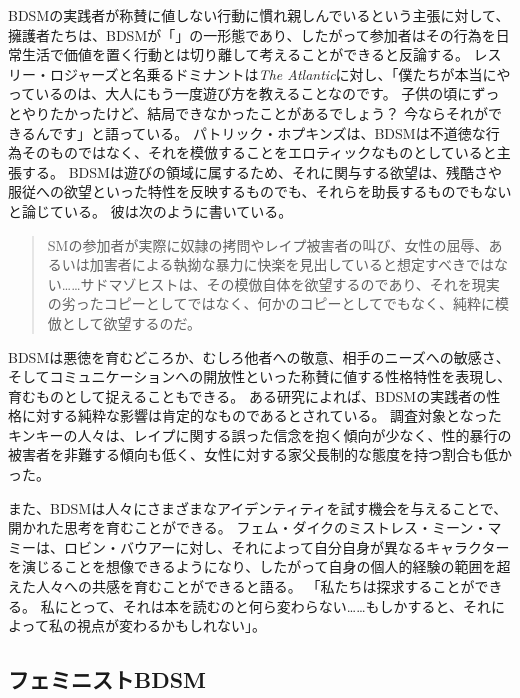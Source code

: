 \documentclass[paper=a4,book,openany]{jlreq}
\begin{document}
BDSMの実践者が称賛に値しない行動に慣れ親しんでいるという主張に対して、擁護者たちは、BDSMが「」の一形態であり、したがって参加者はその行為を日常生活で価値を置く行動とは切り離して考えることができると反論する。
レスリー・ロジャーズと名乗るドミナントは\emph{The Atlantic}に対し、「僕たちが本当にやっているのは、大人にもう一度遊び方を教えることなのです。
子供の頃にずっとやりたかったけど、結局できなかったことがあるでしょう？ 今ならそれができるんです」と語っている\citep{morin15:_that_time_i_tried_bdsm_therap}。
パトリック・ホプキンズは、BDSMは不道徳な行為そのものではなく、それを模倣することをエロティックなものとしていると主張する。
BDSMは遊びの領域に属するため、それに関与する欲望は、残酷さや服従への欲望といった特性を反映するものでも、それらを助長するものでもないと論じている。
彼は次のように書いている。

\begin{quote}
  SMの参加者が実際に奴隷の拷問やレイプ被害者の叫び、女性の屈辱、あるいは加害者による執拗な暴力に快楽を見出していると想定すべきではない……サドマゾヒストは、その模倣自体を欲望するのであり、それを現実の劣ったコピーとしてではなく、何かのコピーとしてでもなく、純粋に模倣として欲望するのだ。
\citep[p.125]{hopkins94:_rethin_sadom}

\end{quote}

BDSMは悪徳を育むどころか、むしろ他者への敬意、相手のニーズへの敏感さ、そしてコミュニケーションへの開放性といった称賛に値する性格特性を表現し、育むものとして捉えることもできる。
ある研究によれば、BDSMの実践者の性格に対する純粋な影響は肯定的なものであるとされている。
調査対象となったキンキーの人々は、レイプに関する誤った信念を抱く傾向が少なく、性的暴行の被害者を非難する傾向も低く、女性に対する家父長制的な態度を持つ割合も低かった\citep[p.1]{klement16:_partic_cultur_consen_may_be}。

また、BDSMは人々にさまざまなアイデンティティを試す機会を与えることで、開かれた思考を育むことができる。
フェム・ダイクのミストレス・ミーン・マミーは、ロビン・バウアーに対し、それによって自分自身が異なるキャラクターを演じることを想像できるようになり、したがって自身の個人的経験の範囲を超えた人々への共感を育むことができると語る。
「私たちは探求することができる。
私にとって、それは本を読むのと何ら変わらない……もしかすると、それによって私の視点が変わるかもしれない」\citep[p.141]{bauer18:_bois_grrrl_meet_their_daddies}。

\subsection{フェミニストBDSM}
\end{document}
